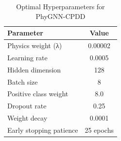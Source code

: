 
\begin{table}[h]
\centering
\caption{Optimal Hyperparameters for PhyGNN-CPDD}
\label{tab:hyperparams}
\begin{tabular}{lc}
\toprule
\textbf{Parameter} & \textbf{Value} \\
\midrule
Physics weight (λ) & 0.00002 \\
Learning rate & 0.0005 \\
Hidden dimension & 128 \\
Batch size & 8 \\
Positive class weight & 8.0 \\
Dropout rate & 0.25 \\
Weight decay & 0.0001 \\
Early stopping patience & 25 epochs \\
\bottomrule
\end{tabular}
\end{table}
